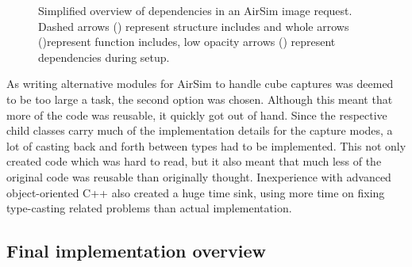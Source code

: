 \begin{figure}[!htb]
    \caption{Simplified overview of dependencies in an AirSim image request. Dashed arrows (\protect\drawdashedarrow) represent structure includes and whole arrows (\protect\drawarrow)represent function includes, low opacity arrows (\protect\drawopacitydarrow) represent dependencies during setup.}
    \label{fig:comm_pattern_camera_request}
\end{figure}

As writing alternative modules for AirSim to handle cube captures was deemed to be too large a task, the second option was chosen. Although this meant that more of the code was reusable, it quickly got out of hand. Since the respective child classes carry much of the implementation details for the capture modes, a lot of casting back and forth between types had to be implemented. This not only created code which was hard to read, but it also meant that much less of the original code was reusable than originally thought. Inexperience with advanced object-oriented C++ also created a huge time sink, using more time on fixing type-casting related problems than actual implementation.

\subsection{Final implementation overview} \label{subsec:Fisheye_impl_overview}

